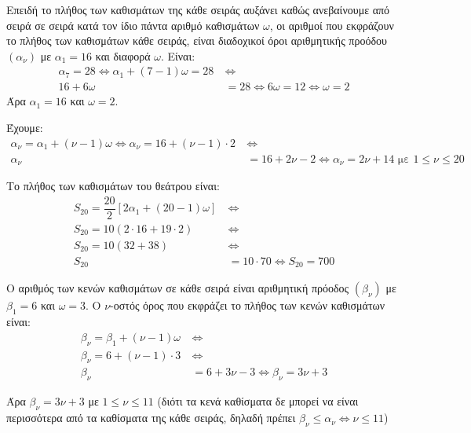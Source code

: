 
\begin{alist}
\item Επειδή το πλήθος των καθισμάτων της κάθε σειράς αυξάνει καθώς ανεβαίνουμε από σειρά σε σειρά κατά τον ίδιο πάντα αριθμό καθισμάτων $\omega$, οι αριθμοί που εκφράζουν το πλήθος των καθισμάτων κάθε σειράς, είναι διαδοχικοί όροι αριθμητικής προόδου $(\alpha_\nu)$ με $\alpha_1 = 16$ και διαφορά $\omega$.
Είναι:
\begin{align*}
\alpha_7 = 28 \Leftrightarrow \alpha_1 + (7 - 1)\omega = 28 \ &\Leftrightarrow \\
16 + 6\omega &= 28 \Leftrightarrow 6\omega = 12 \Leftrightarrow \omega = 2
\end{align*}
Άρα $\alpha_1 = 16$ και $\omega = 2$.

\item Έχουμε:
\begin{align*}
\alpha_\nu = \alpha_1 + (\nu - 1)\omega \Leftrightarrow \alpha_\nu = 16 + (\nu - 1) \cdot 2 \ &\Leftrightarrow \\
\alpha_\nu &= 16 + 2\nu - 2 \Leftrightarrow \alpha_\nu = 2\nu + 14 \text{ με } 1 \le \nu \le 20
\end{align*}

\item Το πλήθος των καθισμάτων του θεάτρου είναι:
\begin{align*}
S_{20} = \dfrac{20}{2}[2\alpha_1 + (20 - 1)\omega] \ &\Leftrightarrow \\
S_{20} = 10(2 \cdot 16 + 19 \cdot 2) \ &\Leftrightarrow \\
S_{20} = 10(32 + 38) \ &\Leftrightarrow \\
S_{20} &= 10 \cdot 70 \Leftrightarrow S_{20} = 700
\end{align*}

\item Ο αριθμός των κενών καθισμάτων σε κάθε σειρά είναι αριθμητική πρόοδος $(\beta_\nu)$ με
$\beta_1 = 6$ και $\omega = 3$. Ο $\nu$-οστός όρος που εκφράζει το πλήθος των κενών καθισμάτων είναι:
\begin{align*}
\beta_\nu = \beta_1 + (\nu - 1)\omega \ &\Leftrightarrow \\
\beta_\nu = 6 + (\nu - 1) \cdot 3 \ &\Leftrightarrow \\
\beta_\nu &= 6 + 3\nu - 3 \Leftrightarrow \beta_\nu = 3\nu + 3
\end{align*}

Άρα $\beta_\nu = 3\nu + 3$ με $1 \le \nu \le 11$ (διότι τα κενά καθίσματα δε μπορεί να είναι περισσότερα από τα καθίσματα της κάθε σειράς, δηλαδή πρέπει $\beta_\nu \le \alpha_\nu \Leftrightarrow \nu \le 11$)


\end{alist}
